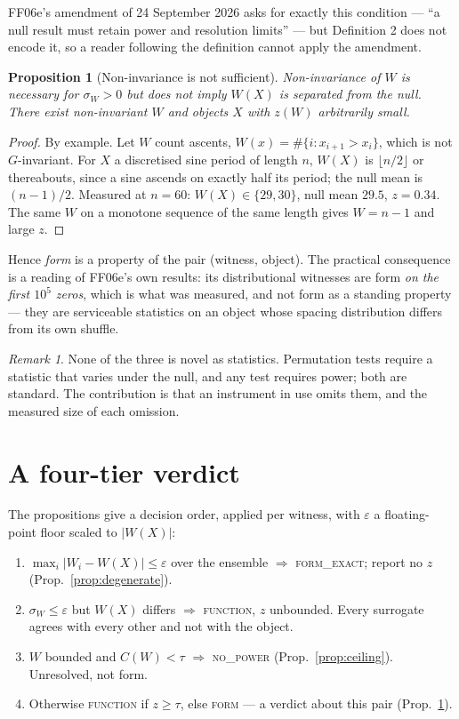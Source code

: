 \documentclass[11pt]{article}
\newtheorem{proposition}{Proposition}
\theoremstyle{remark}
\newtheorem{remark}{Remark}
\newcommand{\tier}[1]{\textsc{#1}}
\begin{document}
FF06e's amendment of 24 September 2026 asks for exactly this condition --- ``a null
result must retain power and resolution limits'' --- but Definition 2 does not encode it,
so a reader following the definition cannot apply the amendment.

\begin{proposition}[Non-invariance is not sufficient]\label{prop:necessary}
Non-invariance of $W$ is necessary for $\sigma_W>0$ but does not imply $W(X)$ is
separated from the null. There exist non-invariant $W$ and objects $X$ with
$z(W)$ arbitrarily small.
\end{proposition}
\begin{proof}
By example. Let $W$ count ascents, $W(x)=\#\{i: x_{i+1}>x_i\}$, which is not
$G$-invariant. For $X$ a discretised sine period of length $n$, $W(X)$ is
$\lfloor n/2\rfloor$ or thereabouts, since a sine ascends on exactly half its period;
the null mean is $(n-1)/2$. Measured at $n=60$: $W(X)\in\{29,30\}$, null mean $29.5$,
$z=0.34$. The same $W$ on a monotone sequence of the same length gives $W=n-1$ and large
$z$.
\end{proof}

Hence \emph{form} is a property of the pair (witness, object). The practical consequence
is a reading of FF06e's own results: its distributional witnesses are form \emph{on the
first $10^5$ zeros}, which is what was measured, and not form as a standing property ---
they are serviceable statistics on an object whose spacing distribution differs from its
own shuffle.

\begin{remark}
None of the three is novel as statistics. Permutation tests require a statistic that
varies under the null, and any test requires power; both are standard. The contribution
is that an instrument in use omits them, and the measured size of each omission.
\end{remark}

\section{A four-tier verdict}\label{sec:tiers}

The propositions give a decision order, applied per witness, with $\varepsilon$ a
floating-point floor scaled to $|W(X)|$:

\begin{enumerate}[leftmargin=2em,itemsep=2pt]
\item $\max_i|W_i-W(X)|\le\varepsilon$ over the ensemble $\Rightarrow$ \tier{form\_exact};
      report no $z$ (Prop.~\ref{prop:degenerate}).
\item $\sigma_W\le\varepsilon$ but $W(X)$ differs $\Rightarrow$ \tier{function}, $z$
      unbounded. Every surrogate agrees with every other and not with the object.
\item $W$ bounded and $C(W)<\tau$ $\Rightarrow$ \tier{no\_power}
      (Prop.~\ref{prop:ceiling}). Unresolved, not form.
\item Otherwise \tier{function} if $z\ge\tau$, else \tier{form} --- a verdict about this
      pair (Prop.~\ref{prop:necessary}).
\end{enumerate}
\end{document}
